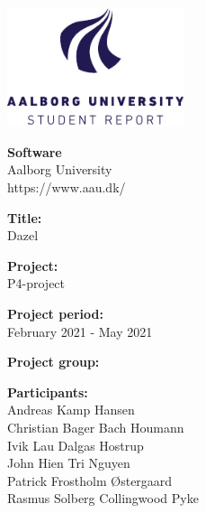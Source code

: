 {}
\thispagestyle{empty}

\begin{singlespace} 
\begin{minipage}[t]{0.48\textwidth}
    \vspace*{-25pt}			%
    \includegraphics[height=3.5cm]{AAUgraphics/aau_logo_en}
    \end{minipage}
    \hfill
    \begin{minipage}[t]{0.48\textwidth} {
        \small 
        \textbf{Software} \\
        Aalborg University \\
        https://www.aau.dk/
    }
\end{minipage}

\vspace*{1cm}

\begin{minipage}[t]{0.48\textwidth}
    \textbf{Title:} \\[5pt]\bigskip\hspace{2ex}
    Dazel
    
    \textbf{Project:} \\[5pt]\bigskip\hspace{2ex}
    P4-project
    
    \textbf{Project period:} \\[5pt]\bigskip\hspace{2ex}
    February 2021 - May 2021
    
    \textbf{Project group:} \\[5pt]\bigskip\hspace{2ex}
    \authorname %
    
    \textbf{Participants:} \\[5pt]\hspace*{2ex}
    Andreas Kamp Hansen \\\hspace*{2ex}
    Christian Bager Bach Houmann \\\hspace*{2ex}
    Ivik Lau Dalgas Hostrup \\\hspace*{2ex}
    John Hien Tri Nguyen \\\hspace*{2ex}
    Patrick Frostholm Østergaard \\\hspace*{2ex}
    Rasmus Solberg Collingwood Pyke \\\hspace*{2ex}
    

\end{minipage}
\end{singlespace}
